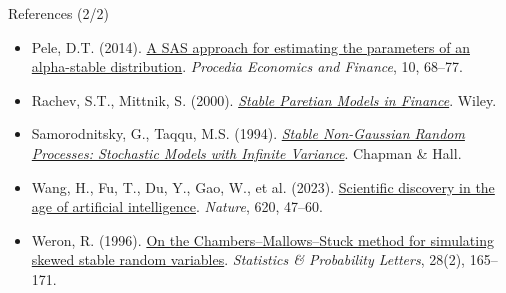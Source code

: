 \begin{frame}{References (2/2)}
\begin{itemize}
    \item Pele, D.T. (2014). \href{https://doi.org/10.1016/S2212-5671(14)00279-2}{A SAS approach for estimating the parameters of an alpha-stable distribution}. \textit{Procedia Economics and Finance}, 10, 68--77.
    \item Rachev, S.T., Mittnik, S. (2000). \href{https://www.wiley.com/en-us/Stable+Paretian+Models+in+Finance-p-9780471953142}{\textit{Stable Paretian Models in Finance}}. Wiley.
    \item Samorodnitsky, G., Taqqu, M.S. (1994). \href{https://doi.org/10.1201/9780203738818}{\textit{Stable Non-Gaussian Random Processes: Stochastic Models with Infinite Variance}}. Chapman \& Hall.
    \item Wang, H., Fu, T., Du, Y., Gao, W., et al. (2023). \href{https://doi.org/10.1038/s41586-023-06221-2}{Scientific discovery in the age of artificial intelligence}. \textit{Nature}, 620, 47--60.
    \item Weron, R. (1996). \href{https://doi.org/10.1016/0167-7152(95)00113-1}{On the Chambers--Mallows--Stuck method for simulating skewed stable random variables}. \textit{Statistics \& Probability Letters}, 28(2), 165--171.
\end{itemize}
\end{frame}


